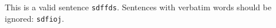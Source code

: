 \documentclass{article}
\begin{document}
This is a valid sentence \verb!sdffds!.
Sentences with verbatim words should be ignored: \verb=sdfioj=.
\end{document}
